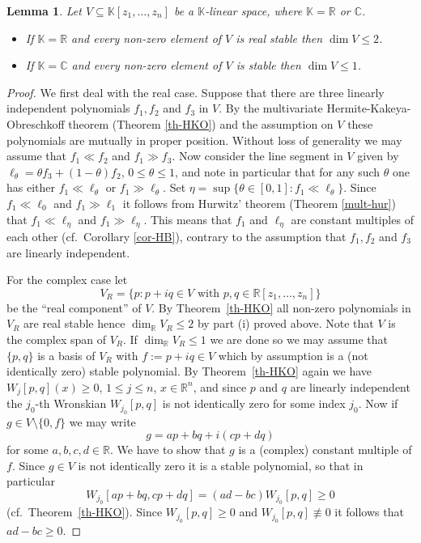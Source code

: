\documentclass[10pt,reqno]{amsart}
\theoremstyle{plain}
\newtheorem{lemma}[theorem]{Lemma}
\theoremstyle{definition}
\theoremstyle{remark}
\numberwithin{equation}{section}
\newcommand{\RR}{\mathbb{R}}
\newcommand{\CC}{\mathbb{C}}
\newcommand{\KK}{\mathbb{K}}
\begin{document}
\begin{lemma}\label{spaces}
Let $V \subseteq \KK[z_1,\ldots, z_n]$ be a $\KK$-linear space, 
where $\KK=\RR$ or $\CC$.
\begin{itemize}
\item[(i)] If $\KK=\RR$ and every non-zero element of $V$ is real stable 
then $\dim V \leq 2$.
\item[(ii)]
If $\KK=\CC$ and every non-zero element of $V$ is stable 
then $\dim V \leq 1$.
\end{itemize}
\end{lemma}

\begin{proof}
We first deal with the real case. Suppose that there are three linearly 
independent polynomials $f_1,f_2$  and $f_3$ 
in $V$. By the multivariate Hermite-Kakeya-Obreschkoff theorem 
(Theorem \ref{th-HKO}) and the assumption on $V$ 
these polynomials are mutually in proper position. 
Without loss of generality we may assume that 
$f_1 \ll f_2$ and $f_1 \gg f_3$. Now consider the line  
segment in $V$ given by $\ell_\theta =\theta f_3 + (1-\theta) f_2$, 
$0 \leq \theta \leq 1$, and note in particular that for any such $\theta$ one 
has either $f_1\ll \ell_\theta$ or $f_1\gg \ell_\theta$.
Set $\eta=\sup\{\theta\in[0,1]:f_1\ll \ell_\theta\}$.
Since $f_1 \ll \ell_0$ and $f_1 \gg \ell_1$ it follows from Hurwitz' theorem  
(Theorem \ref{mult-hur}) that $f_1 \ll \ell_\eta$ and $f_1 \gg \ell_\eta$. 
This means that $f_1$ and $\ell_\eta$ are constant multiples of each other
(cf.~Corollary \ref{cor-HB}), 
contrary to the assumption that $f_1,f_2$  and $f_3$ are linearly independent. 

For the complex case 
let 
$$
V_R= \{ p : p+iq \in V\text{ with } p,q\in \RR[z_1,\ldots,z_n] \}
$$ 
be the ``real component'' of $V$. By Theorem~\ref{th-HKO} all 
non-zero polynomials 
in $V_R$ are real stable
hence $\dim_{\RR} V_R \leq 2$ by part (i) proved above. Note that 
$V$ is the complex span of $V_R$. If $\dim_{\RR} V_R \leq 1$ we are done so 
we may assume that 
$\{p,q\}$ is a basis of $V_R$ with $f:=p+iq \in V$ which by assumption is
a (not identically zero) stable polynomial. By 
Theorem~\ref{th-HKO} again we have $W_j[p,q](x) \geq 0$, $1\leq j \leq n$, 
$x\in\RR^n$, and since $p$ and $q$ are linearly 
independent the $j_0$-th Wronskian $W_{j_0}[p,q]$ 
is not identically zero for some index $j_0$. 
Now if $g\in V\setminus\{0,f\}$ we may write 
$$
g= ap+bq+i(cp+dq) 
$$
for some $a,b,c,d \in \RR$. We have to show that $g$ is a (complex) constant 
multiple of $f$. Since $g \in V$ is not identically zero it is a stable 
polynomial, so that in particular 
$$
W_{j_0}[ap+bq,cp+dq] = (ad-bc)W_{j_0}[p,q] \geq 0
$$
(cf.~Theorem~\ref{th-HKO}). Since $W_{j_0}[p,q] \geq 0$ and 
$W_{j_0}[p,q]\not\equiv 0$ 
it follows that $ad-bc \geq 0$. 


\end{proof}
\end{document}
